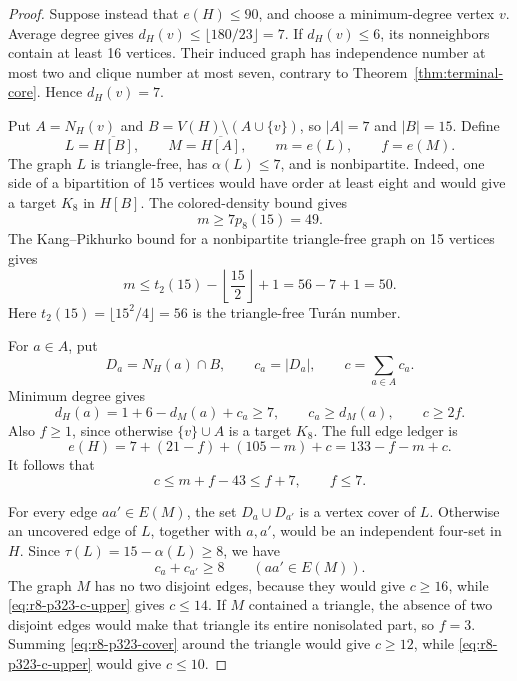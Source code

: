 \documentclass[11pt,reqno,a4paper]{amsart}
\theoremstyle{definition}
\theoremstyle{remark}
\newcommand{\comp}[1]{\overline{#1}}
\begin{document}
\begin{proof}
Suppose instead that $e(H)\leq90$, and choose a minimum-degree vertex
$v$. Average degree gives $d_H(v)\leq\lfloor180/23\rfloor=7$. If
$d_H(v)\leq6$, its nonneighbors contain at least 16 vertices. Their
induced graph has independence number at most two and clique number at
most seven, contrary to Theorem~\ref{thm:terminal-core}. Hence
$d_H(v)=7$.

Put $A=N_H(v)$ and $B=V(H)\setminus(A\cup\{v\})$, so $|A|=7$ and
$|B|=15$. Define
\[
 L=\comp{H[B]},\qquad M=\comp{H[A]},
 \qquad m=e(L),\qquad f=e(M).
\]
The graph $L$ is triangle-free, has $\alpha(L)\leq7$, and is
nonbipartite. Indeed, one side of a bipartition of 15 vertices would have
order at least eight and would give a target $K_8$ in $H[B]$.
The colored-density bound gives
\begin{equation}\label{eq:r8-p323-m-lower}
 m\geq7p_8(15)=49.
\end{equation}
The Kang--Pikhurko bound for a nonbipartite triangle-free graph on 15
vertices gives
\begin{equation}\label{eq:r8-p323-m-upper}
 m\leq t_2(15)-\left\lfloor\frac{15}{2}\right\rfloor+1
 =56-7+1=50.
\end{equation}
Here $t_2(15)=\lfloor15^2/4\rfloor=56$ is the triangle-free Tur\'an
number.

For $a\in A$, put
\[
 D_a=N_H(a)\cap B,
 \qquad c_a=|D_a|,
 \qquad c=\sum_{a\in A}c_a.
\]
Minimum degree gives
\[
 d_H(a)=1+6-d_M(a)+c_a\geq7,
 \qquad c_a\geq d_M(a),
 \qquad c\geq2f.
\]
Also $f\geq1$, since otherwise $\{v\}\cup A$ is a target $K_8$.
The full edge ledger is
\begin{equation}\label{eq:r8-p323-edge-ledger}
 e(H)=7+(21-f)+(105-m)+c=133-f-m+c.
\end{equation}
It follows that
\begin{equation}\label{eq:r8-p323-c-upper}
 c\leq m+f-43\leq f+7,
 \qquad f\leq7.
\end{equation}

For every edge $aa'\in E(M)$, the set $D_a\cup D_{a'}$ is a vertex
cover of $L$. Otherwise an uncovered edge of $L$, together with $a,a'$,
would be an independent four-set in $H$. Since
$\tau(L)=15-\alpha(L)\geq8$, we have
\begin{equation}\label{eq:r8-p323-cover}
 c_a+c_{a'}\geq8\qquad(aa'\in E(M)).
\end{equation}
The graph $M$ has no two disjoint edges, because they would give
$c\geq16$, while \eqref{eq:r8-p323-c-upper} gives $c\leq14$. If $M$
contained a triangle, the absence of two disjoint edges would make that
triangle its entire nonisolated part, so $f=3$. Summing
\eqref{eq:r8-p323-cover} around the triangle would give $c\geq12$, while
\eqref{eq:r8-p323-c-upper} would give $c\leq10$.


\end{proof}
\end{document}
